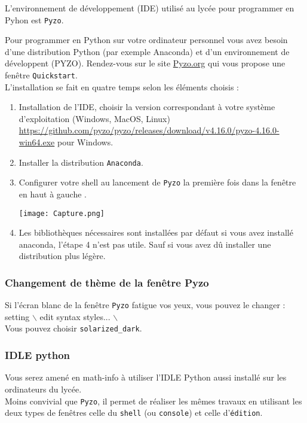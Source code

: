 L'environnement de développement (IDE) utilisé au lycée pour programmer en Pyhon est \texttt{Pyzo}.

Pour programmer en Python sur votre ordinateur personnel vous avez besoin d'une distribution Python (par exemple Anaconda) et d'un environnement de développent (PYZO).
Rendez-vous sur le site \url{Pyzo.org} qui vous propose une fenêtre \texttt{Quickstart}.\\
L'installation se fait en quatre temps selon les éléments choisis :
\begin{enumerate}
\item Installation de l'IDE, choisir la version correspondant à votre système d'exploitation (Windows, MacOS, Linux) \url{https://github.com/pyzo/pyzo/releases/download/v4.16.0/pyzo-4.16.0-win64.exe} pour Windows.
\item Installer la distribution \texttt{Anaconda}.
\item Configurer votre shell au lancement de \texttt{Pyzo} la première fois dans la fenêtre en haut à gauche .

\begin{center}
\texttt{[image: Capture.png]}
\end{center}

\item Les bibliothèques nécessaires sont installées par défaut si vous avez installé anaconda, l'étape 4 n'est pas utile. Sauf si vous avez dû installer une distribution plus légère.
\end{enumerate}






\subsubsection{Changement de thème de la fenêtre Pyzo}
Si l'écran blanc de la fenêtre \texttt{Pyzo} fatigue vos yeux, vous pouvez le changer :\\
setting $\backslash$ edit syntax styles... $\backslash$ \\
Vous pouvez choisir \texttt{solarized\_dark}.


\subsubsection{IDLE python}
Vous serez amené en math-info à utiliser l'IDLE Python aussi installé sur les ordinateurs du lycée.\\
Moins convivial que \texttt{Pyzo}, il permet de réaliser les mêmes travaux en utilisant les deux types de fenêtres celle du \texttt{shell} (ou \texttt{console}) et celle d'\texttt{édition}.


